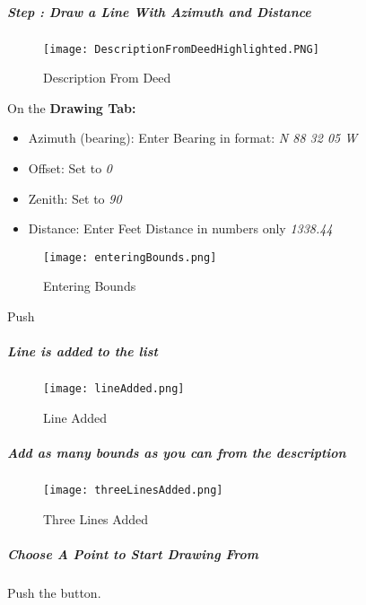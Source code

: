 
\subparagraph*{{\LARGE Step \thestepCount:} Draw a Line With Azimuth and Distance}

\begin{figure}[H]
\centering
    \texttt{[image: DescriptionFromDeedHighlighted.PNG]}
\vspace{-.1in}

\caption{Description From Deed}
\end{figure}
On the \textbf{Drawing Tab:}
\begin{itemize}
\item Azimuth (bearing): Enter Bearing in format: \emph{N 88 32 05 W}
\item Offset: Set to \emph{0}
\item Zenith: Set to \emph{90}
\item Distance: Enter Feet Distance in numbers only \emph{1338.44}
\end{itemize}
\begin{figure}[H]
\centering
    \texttt{[image: enteringBounds.png]}
\vspace{-.1in}

\caption{Entering Bounds}
\end{figure}

{\LARGE Push }

\clearpage


\subparagraph*{Line is added to the list}

\begin{figure}[H]
\centering
    \texttt{[image: lineAdded.png]}
\vspace{-.1in}

\caption{Line Added}
\end{figure}


\subparagraph*{Add as many bounds as you can from the description}

\begin{figure}[H]
\centering
    \texttt{[image: threeLinesAdded.png]}
\vspace{-.1in}

\caption{Three Lines Added}
\end{figure}

\clearpage

\subparagraph*{Choose A Point to Start Drawing From\\}
Push the \textbf{} button.\\

